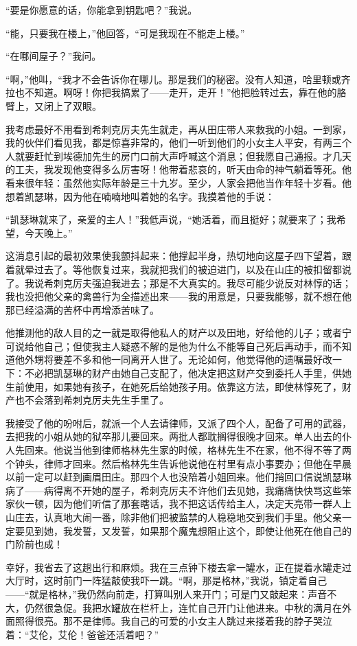 \par “要是你愿意的话，你能拿到钥匙吧？”我说。
\par “能，只要我在楼上，”他回答，“可是我现在不能走上楼。”
\par “在哪间屋子？”我问。
\par “啊，”他叫，“我才不会告诉你在哪儿。那是我们的秘密。没有人知道，哈里顿或齐拉也不知道。啊呀！你把我搞累了——走开，走开！”他把脸转过去，靠在他的胳臂上，又闭上了双眼。
\par 我考虑最好不用看到希刺克厉夫先生就走，再从田庄带人来救我的小姐。一到家，我的伙伴们看见我，都是惊喜非常的，他们一听到他们的小女主人平安，有两三个人就要赶忙到埃德加先生的房门口前大声呼喊这个消息；但我愿自己通报。才几天的工夫，我发现他变得多么厉害呀！他带着悲哀的，听天由命的神气躺着等死。他看来很年轻：虽然他实际年龄是三十九岁。至少，人家会把他当作年轻十岁看。他想着凯瑟琳，因为他在喃喃地叫着她的名字。我摸着他的手说：
\par “凯瑟琳就来了，亲爱的主人！”我低声说，“她活着，而且挺好；就要来了；我希望，今天晚上。”
\par 这消息引起的最初效果使我颤抖起来：他撑起半身，热切地向这屋子四下望着，跟着就晕过去了。等他恢复过来，我就把我们的被迫进门，以及在山庄的被扣留都说了。我说希刺克厉夫强迫我进去；那是不大真实的。我尽可能少说反对林惇的话；我也没把他父亲的禽兽行为全描述出来——我的用意是，只要我能够，就不想在他那已经溢满的苦杯中再增添苦味了。
\par 他推测他的敌人目的之一就是取得他私人的财产以及田地，好给他的儿子；或者宁可说给他自己；但使我主人疑惑不解的是他为什么不能等自己死后再动手，而不知道他外甥将要差不多和他一同离开人世了。无论如何，他觉得他的遗嘱最好改一下：不必把凯瑟琳的财产由她自己支配了，他决定把这财产交到委托人手里，供她生前使用，如果她有孩子，在她死后给她孩子用。依靠这方法，即使林惇死了，财产也不会落到希刺克厉夫先生手里了。
\par 我接受了他的吩咐后，就派一个人去请律师，又派了四个人，配备了可用的武器，去把我的小姐从她的狱卒那儿要回来。两批人都耽搁得很晚才回来。单人出去的仆人先回来。他说当他到律师格林先生家的时候，格林先生不在家，他不得不等了两个钟头，律师才回来。然后格林先生告诉他说他在村里有点小事要办；但他在早晨以前一定可以赶到画眉田庄。那四个人也没陪着小姐回来。他们捎回口信说凯瑟琳病了——病得离不开她的屋子，希刺克厉夫不许他们去见她，我痛痛快快骂这些笨家伙一顿，因为他们听信了那套瞎话，我不把这话传给主人，决定天亮带一群人上山庄去，认真地大闹一番，除非他们把被监禁的人稳稳地交到我们手里。他父亲一定要见到她，我发誓，又发誓，如果那个魔鬼想阻止这个，即使让他死在他自己的门阶前也成！
\par 幸好，我省去了这趟出行和麻烦。我在三点钟下楼去拿一罐水，正在提着水罐走过大厅时，这时前门一阵猛敲使我吓一跳。“啊，那是格林，”我说，镇定着自己——“就是格林，”我仍然向前走，打算叫别人来开门；可是门又敲起来：声音不大，仍然很急促。我把水罐放在栏杆上，连忙自己开门让他进来。中秋的满月在外面照得很亮。那不是律师。我自己的可爱的小女主人跳过来搂着我的脖子哭泣着：“艾伦，艾伦！爸爸还活着吧？”
